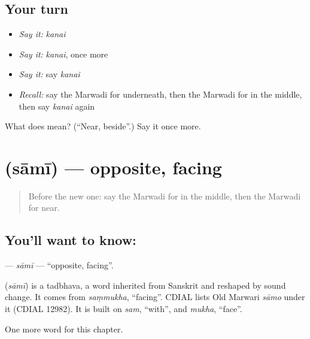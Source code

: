 \subsection*{Your turn}
\begin{itemize}
\raggedright
  \item \emph{Say it:} \emph{kanai}
  \item \emph{Say it:} \emph{kanai}, once more
  \item \emph{Say it:} say \emph{kanai}
  \item \emph{Recall:} say the Marwadi for underneath, then the Marwadi for in the middle, then say \emph{kanai} again
\end{itemize}

\begin{tcolorbox}[breakable,colback=teal!4,colframe=teal!35!black,title={Before you move on}]
What does  mean? (\textquotedblleft{}Near, beside\textquotedblright{}.) Say it once more.
\end{tcolorbox}
\section[\texorpdfstring{\mw{सामी} (sāmī)}{सामी (sāmī)}]{ (sāmī) — opposite, facing}

\label{lesson:MW-C97-sami}



\begin{quote}
Before the new one: say the Marwadi for in the middle, then the Marwadi for near.
\end{quote}

\subsection*{You'll want to know: }
\textbf{} — \emph{sāmī} — \textquotedblleft{}opposite, facing\textquotedblright{}.

\begin{cousinweb}
\textbf{} (\emph{sāmī}) is a tadbhava, a word inherited from Sanskrit and reshaped by sound change. It comes from \emph{saṃmukha}, \textquotedblleft{}facing\textquotedblright{}. CDIAL lists Old Marwari \emph{sāmo} under it (CDIAL 12982). It is built on \emph{sam}, \textquotedblleft{}with\textquotedblright{}, and \emph{mukha}, \textquotedblleft{}face\textquotedblright{}.
\end{cousinweb}

\begin{grammarlens}[title={What you've built}]
One more word for this chapter.
\end{grammarlens}

